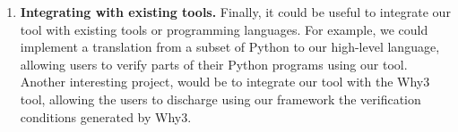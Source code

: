 \begin{enumerate}
    \item \textbf{Integrating with existing tools.} Finally, it could be useful to integrate our tool with
    existing tools or programming languages. For example, we could implement a translation from a subset 
    of Python to our high-level language, allowing users to verify parts of their Python programs using our tool.
    Another interesting project, would be to integrate our tool with the Why3 tool,
    allowing the users to discharge using our framework the verification conditions generated by Why3.

\end{enumerate}
